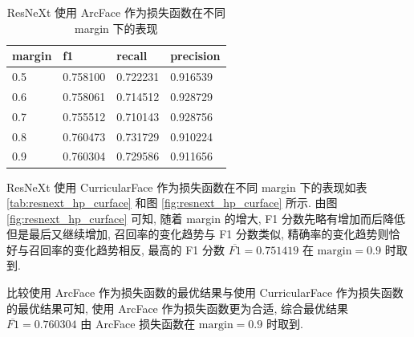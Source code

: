 \documentclass[12pt]{article}
\begin{document}
\begin{table}[htbp]
  \centering
  \caption{ResNeXt 使用 ArcFace 作为损失函数在不同 margin 下的表现}
  \label{tab:resnext_hp_arcface}
  \begin{tabular}{llll}
    \toprule
    margin & f1       & recall   & precision \\
    \midrule
    0.5 & 0.758100 & 0.722231 & 0.916539  \\
    0.6 & 0.758061 & 0.714512 & 0.928729  \\
    0.7 & 0.755512 & 0.710143 & 0.928756  \\
    0.8 & 0.760473 & 0.731729 & 0.910224  \\
    0.9 & 0.760304 & 0.729586 & 0.911656 \\
    \bottomrule
  \end{tabular}
\end{table}

ResNeXt 使用 CurricularFace 作为损失函数在不同 margin 下的表现如表 \ref{tab:resnext_hp_curface} 和图 \ref{fig:resnext_hp_curface} 所示. 由图 \ref{fig:resnext_hp_curface} 可知, 随着 margin 的增大, F1 分数先略有增加而后降低但是最后又继续增加, 召回率的变化趋势与 F1 分数类似, 精确率的变化趋势则恰好与召回率的变化趋势相反, 最高的 F1 分数 $\overline{F1}=0.751419$ 在 $\text{margin} = 0.9$ 时取到.

比较使用 ArcFace 作为损失函数的最优结果与使用 CurricularFace 作为损失函数的最优结果可知, 使用 ArcFace 作为损失函数更为合适, 综合最优结果 $\overline{F1}=0.760304$ 由 ArcFace 损失函数在 $\text{margin} = 0.9$ 时取到.
\end{document}
